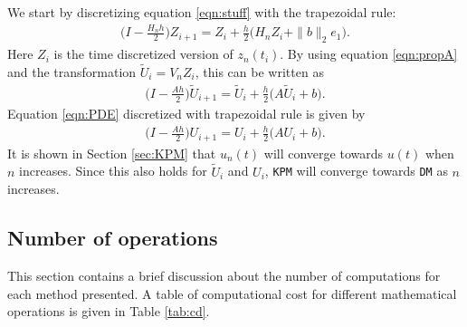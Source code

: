 \noindent We start by discretizing equation \eqref{eqn:stuff} with the trapezoidal rule:
\begin{equation*}
\begin{aligned}
\Big(I-\frac{H_n h}{2}\Big) Z_{i+1} = Z_i + \frac{h}{2} \big( H_n Z_i + \| b \|_2 e_1 \big) .
\end{aligned}
\end{equation*}
Here $Z_i$ is the time discretized version of $z_n(t_i)$.
By using equation \eqref{eqn:propA} and the transformation $\tilde{U}_i = V_n Z_i$, this can be written as
\begin{equation*}
\begin{aligned}
\Big(I-\frac{Ah}{2} \Big) \tilde{U}_{i+1} =  \tilde{U}_i + \frac{h}{2} \big( A \tilde{U}_i +b \big) .
\end{aligned}
\end{equation*}
Equation \eqref{eqn:PDE} discretized with trapezoidal rule is given by
\begin{equation*}
\begin{aligned}
\Big(I-\frac{Ah}{2} \Big) U_{i+1} =  U_i + \frac{h}{2} \big( A U_i +b \big) .
\end{aligned}
\end{equation*}
It is shown in Section \ref{sec:KPM} that $u_n(t)$ will converge towards $u(t)$ when $n$ increases. Since this also holds for $\tilde{U}_i$ and $ U_i $, \texttt{KPM} will converge towards \texttt{DM} as $n$ increases.

\subsection{Number of operations}%
This section contains a brief discussion about the number of computations for each method presented. A table of computational cost for different mathematical operations is given in Table \ref{tab:cd}.  \\

